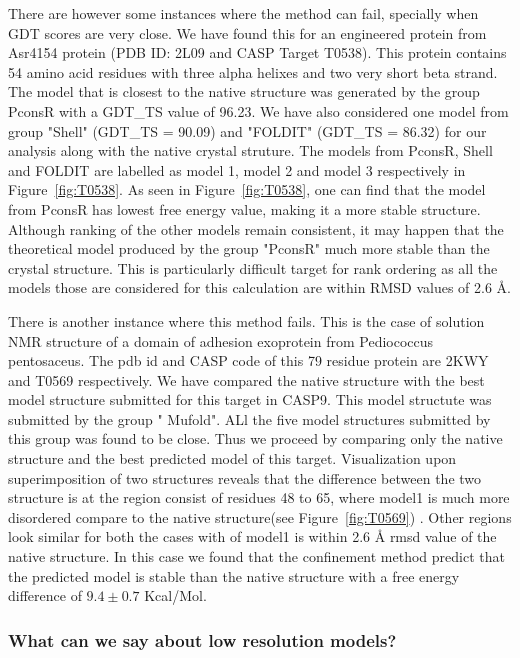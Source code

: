 \documentclass[12pt]{article}
\begin{document}
There are however some instances where the method can fail, specially when GDT scores are
very close. We have found this for an engineered protein from Asr4154 protein (PDB ID: 2L09 and CASP Target T0538).
This protein contains 54 amino acid residues with three alpha helixes and two very short beta strand. 
The model that is closest to the native structure was generated by the group PconsR with a GDT\_TS value of 96.23.
We have also considered one model from group "Shell" (GDT\_TS = 90.09) and "FOLDIT" (GDT\_TS = 86.32) for our analysis along with
the native crystal struture. The models from PconsR, Shell and FOLDIT are labelled as model 1, model 2 and model 3 
respectively in Figure~\ref{fig:T0538}. As seen in Figure~\ref{fig:T0538}, one can find that the 
model from PconsR has lowest free energy value, making it a more stable structure. Although ranking of the other models
remain consistent, it may happen that the theoretical model produced by the group "PconsR" much more stable than the 
crystal structure. This is particularly difficult target for rank ordering as all the models those are considered for this 
calculation are within RMSD values of 2.6 \AA.   

There is another instance where this method fails. This is the case of solution NMR structure of a domain of adhesion exoprotein 
from Pediococcus pentosaceus. The
pdb id and CASP code of this 79 residue protein are 2KWY and T0569 respectively. We have compared the native structure with the
best model structure submitted for this target in CASP9. This model structute was submitted by the group " Mufold". ALl the
five model structures submitted by this group was found to be close. Thus we proceed by comparing only the native structure and
the best predicted model of this target. Visualization upon superimposition of two structures reveals that
the difference between the two structure is at the region consist of residues 48 to 65, where model1 is much more disordered compare to the
native structure(see Figure~\ref{fig:T0569}) . Other regions look similar for both the cases with of model1 is within 2.6 \AA
rmsd value of the native structure. In this case we found that the confinement method predict that the predicted model is stable than the
native structure with a free energy difference of $9.4 \pm 0.7$ Kcal/Mol.

\subsubsection{What can we say about low resolution models?}
\end{document}
